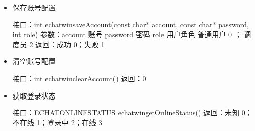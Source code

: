 \documentclass[letterpaper,10pt,english]{sphinxmanual}
\begin{document}
\begin{itemize}
\item {} 
保存账号配置

%
\begin{sphinxVerbatim}[commandchars=\\\{\}]
接口：int echat\PYGZus{}win\PYGZus{}saveAccount(const char* account, const char* password, int role)
参数：account  账号
  password 密码
  role  用户角色 普通用户 0 ； 调度员 2
返回：成功 0；失败 \PYGZhy{}1
\end{sphinxVerbatim}

\item {} 
清空账号配置

%
\begin{sphinxVerbatim}[commandchars=\\\{\}]
接口：int echat\PYGZus{}win\PYGZus{}clearAccount()
返回：0
\end{sphinxVerbatim}

\item {} 
获取登录状态

%
\begin{sphinxVerbatim}[commandchars=\\\{\}]
接口：ECHAT\PYGZus{}ONLINE\PYGZus{}STATUS echat\PYGZus{}win\PYGZus{}getOnlineStatus()
返回：未知 0；不在线 1；登录中  2；在线  3
\end{sphinxVerbatim}

\end{itemize}
\end{document}
